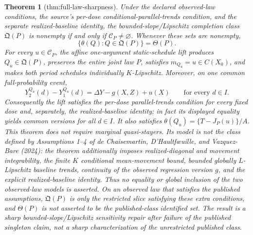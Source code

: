 \documentclass{article}
\newtheorem{theorem}{Theorem}
\begin{document}
\begin{theorem}[thm:full-law-sharpness]\label{thm:full-law-sharpness}
Under the declared observed-law conditions, the source's per-dose conditional-parallel-trends condition, and the separate realized-baseline identity, the bounded-slope/Lipschitz completion class \(\mathfrak Q(P)\) is nonempty if and only if \(\mathcal C_P\neq\varnothing\). Whenever these sets are nonempty,
\[
\{\theta(Q):Q\in\mathfrak Q(P)\}=\Theta(P).
\]
For every \(u\in\mathcal C_P\), the affine one-argument static-schedule lift produces \(Q_u\in\mathfrak Q(P)\), preserves the entire joint law \(P\), satisfies \(m_{Q_u}=u\in C(X_0)\), and makes both period schedules individually \(K\)-Lipschitz. Moreover, on one common full-probability event,
\[
Y_2^{Q_u}(d)-Y_1^{Q_u}(d)=\Delta Y-g(X,Z)+u(X)
\qquad\text{for every }d\in I.
\]
Consequently the lift satisfies the per-dose parallel-trends condition for every fixed dose and, separately, the realized-baseline identity; in fact its displayed equality yields common versions for all \(d\in I\). It also satisfies \(\theta(Q_u)=\{T-J_P(u)\}/A\). This theorem does not require marginal quasi-stayers. Its model is not the class defined by Assumptions 1--4 of de Chaisemartin, D'Haultf\oe{}uille, and Vazquez-Bare (2024): the theorem additionally imposes realized-diagonal and movement integrability, the finite \(K\) conditional mean-movement bound, bounded globally \(L\)-Lipschitz baseline trends, continuity of the observed regression version \(g\), and the explicit realized-baseline identity. Thus no equality or global inclusion of the two observed-law models is asserted. On an observed law that satisfies the published assumptions, \(\mathfrak Q(P)\) is only the restricted slice satisfying these extra conditions, and \(\Theta(P)\) is not asserted to be the published-class identified set. The result is a sharp bounded-slope/Lipschitz sensitivity repair after failure of the published singleton claim, not a sharp characterization of the unrestricted published class.
\end{theorem}
\end{document}

